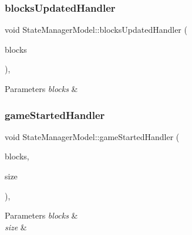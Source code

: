 \subsubsection{\texorpdfstring{blocksUpdatedHandler}{blocksUpdatedHandler}}
{\footnotesize\ttfamily void State\+Manager\+Model\+::blocks\+Updated\+Handler (\begin{DoxyParamCaption}\item[{const std\+::vector$<$ std\+::shared\+\_\+ptr$<$ \mbox{\hyperlink{class_block}{Block}}$<$ \mbox{\hyperlink{class_block_layout_item}{Block\+Layout\+Item}} $>$$>$$>$ \&}]{blocks }\end{DoxyParamCaption})\hspace{0.3cm}{\ttfamily [inline]}, {\ttfamily [slot]}}


\begin{DoxyParams}{Parameters}
{\em blocks} & \\
\hline
\end{DoxyParams}
\mbox{\label{class_state_manager_model_a414fe4dfa55aa139c26b3ccd002328ff}} 
\subsubsection{\texorpdfstring{gameStartedHandler}{gameStartedHandler}}
{\footnotesize\ttfamily void State\+Manager\+Model\+::game\+Started\+Handler (\begin{DoxyParamCaption}\item[{const std\+::vector$<$ std\+::shared\+\_\+ptr$<$ \mbox{\hyperlink{class_block}{Block}}$<$ \mbox{\hyperlink{class_block_layout_item}{Block\+Layout\+Item}} $>$$>$$>$ \&}]{blocks,  }\item[{const size\+\_\+t \&}]{size }\end{DoxyParamCaption})\hspace{0.3cm}{\ttfamily [inline]}, {\ttfamily [slot]}}


\begin{DoxyParams}{Parameters}
{\em blocks} & \\
\hline
{\em size} & \\
\hline
\end{DoxyParams}
\mbox{\label{class_state_manager_model_ade47748f618f84b0a2a32be1da177ad5}} 

